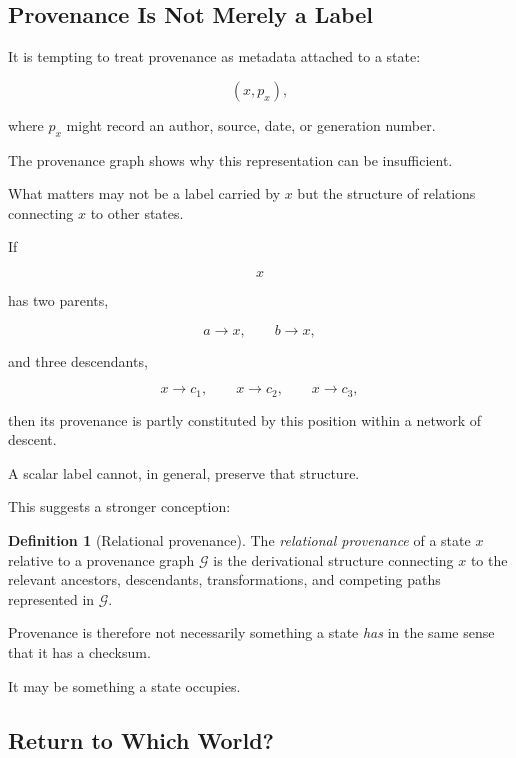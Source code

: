 \documentclass[
  11pt,
  a4paper,
  DIV=12,
  BCOR=0mm,
  parskip=half-
]{scrartcl}
\newcommand{\graphG}{\mathcal G}
\theoremstyle{definition}
\newtheorem{definition}{Definition}[section]
\theoremstyle{plain}
\theoremstyle{remark}
\begin{document}
\subsection{Provenance Is Not Merely a Label}
\label{sec:provenance-topology}

It is tempting to treat provenance as metadata attached to a state:

\[
  (x,p_x),
\]

where \(p_x\) might record an author, source, date, or generation number.

The provenance graph shows why this representation can be insufficient.

What matters may not be a label carried by \(x\) but the structure of
relations connecting \(x\) to other states.

If

\[
  x
\]

has two parents,

\[
  a\to x,
  \qquad
  b\to x,
\]

and three descendants,

\[
  x\to c_1,
  \qquad
  x\to c_2,
  \qquad
  x\to c_3,
\]

then its provenance is partly constituted by this position within a network
of descent.

A scalar label cannot, in general, preserve that structure.

This suggests a stronger conception:

\begin{definition}[Relational provenance]
\label{def:relational-provenance}
The \emph{relational provenance} of a state \(x\) relative to a provenance
graph \(\graphG\) is the derivational structure connecting \(x\) to the
relevant ancestors, descendants, transformations, and competing paths
represented in \(\graphG\).
\end{definition}

Provenance is therefore not necessarily something a state \emph{has} in the
same sense that it has a checksum.

It may be something a state occupies.


\subsection{Return to Which World?}
\label{sec:return-world}
\end{document}
